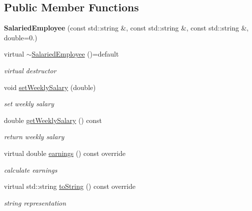 \subsection*{Public Member Functions}
\begin{DoxyCompactItemize}
\item 
\mbox{\label{class_salaried_employee_a4d418f4de5381b4e0af8848013bbb449}} 
{\bfseries Salaried\+Employee} (const std\+::string \&, const std\+::string \&, const std\+::string \&, double=0.)
\item 
\mbox{\label{class_salaried_employee_a718d71a5880188902a040e2509a759b8}} 
virtual \mbox{\hyperlink{class_salaried_employee_a718d71a5880188902a040e2509a759b8}{$\sim$\+Salaried\+Employee}} ()=default
\begin{DoxyCompactList}\small\item\em virtual destructor \end{DoxyCompactList}\item 
\mbox{\label{class_salaried_employee_a97b0a3186e6d2bd3f42f4dd171795dfa}} 
void \mbox{\hyperlink{class_salaried_employee_a97b0a3186e6d2bd3f42f4dd171795dfa}{set\+Weekly\+Salary}} (double)
\begin{DoxyCompactList}\small\item\em set weekly salary \end{DoxyCompactList}\item 
\mbox{\label{class_salaried_employee_a9990ee16056641bf697c030e9e5591a6}} 
double \mbox{\hyperlink{class_salaried_employee_a9990ee16056641bf697c030e9e5591a6}{get\+Weekly\+Salary}} () const
\begin{DoxyCompactList}\small\item\em return weekly salary \end{DoxyCompactList}\item 
\mbox{\label{class_salaried_employee_a917d254c8869beb7a3c1f1d0787b1515}} 
virtual double \mbox{\hyperlink{class_salaried_employee_a917d254c8869beb7a3c1f1d0787b1515}{earnings}} () const override
\begin{DoxyCompactList}\small\item\em calculate earnings \end{DoxyCompactList}\item 
\mbox{\label{class_salaried_employee_a4e23874945c70228e93f9883399c0909}} 
virtual std\+::string \mbox{\hyperlink{class_salaried_employee_a4e23874945c70228e93f9883399c0909}{to\+String}} () const override
\begin{DoxyCompactList}\small\item\em string representation \end{DoxyCompactList}\end{DoxyCompactItemize}


